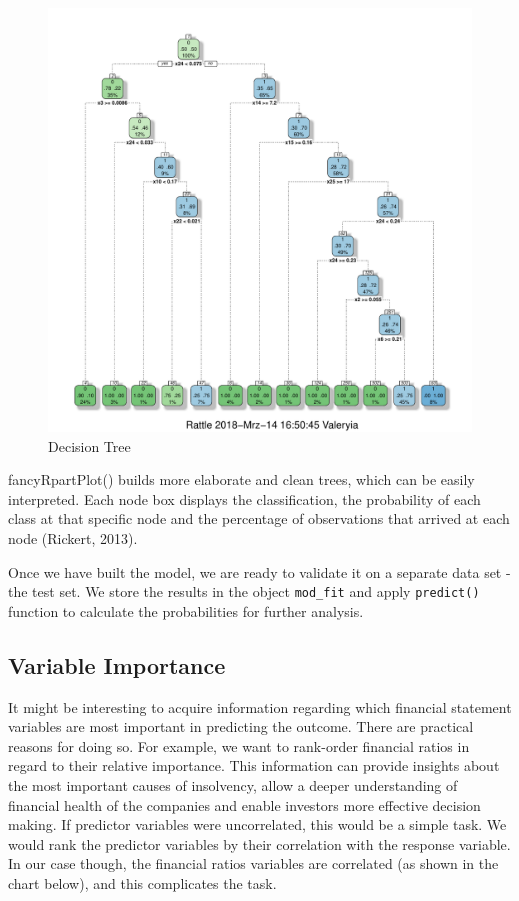 \documentclass{article}
\begin{document}
\begin{figure}
\caption{Decision Tree}
\includegraphics[scale=0.8, trim={0mm 10mm 0mm 0mm}, clip]{../CART/fancyRpartPlot.pdf}
\end{figure}

fancyRpartPlot() builds more elaborate and clean trees, which can be easily interpreted. Each node box displays the classification, the probability of each class at that specific node and the percentage of observations that arrived at each node (Rickert, 2013). 

Once we have built the model, we are ready to validate it on a separate data set - the test set. We store the results in the object \texttt{mod\_fit} and apply \texttt{predict()} function to calculate the probabilities for further analysis. 

\subsection{Variable Importance}

It might be interesting to acquire information regarding which financial statement variables are most important in predicting the outcome. There are practical reasons for doing so. For example, we want to rank-order financial ratios in regard to their relative importance. This information can provide insights about the most important causes of insolvency, allow a deeper understanding of financial health of the companies and enable investors more effective decision making. If predictor variables were uncorrelated, this would be a simple task. We would rank the predictor variables by their correlation with the response variable. In our case though, the financial ratios variables are correlated (as shown in the chart below), and this complicates the task.
 
\end{document}
